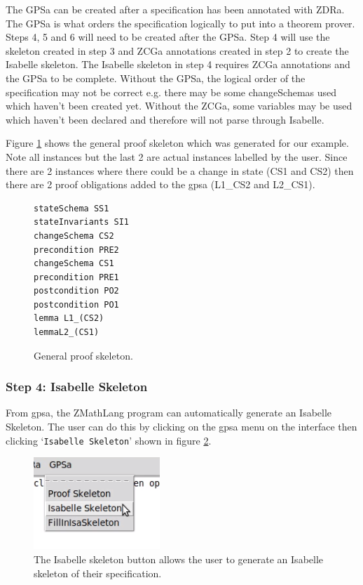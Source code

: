 The GPSa can be created after a specification has been annotated with ZDRa. The GPSa is what orders the specification 
logically to put into a theorem prover. Steps 4, 5 and 6 will need to be created after the GPSa. Step 4 will use the skeleton 
created in step 3 and ZCGa annotations created in step 2 to create the Isabelle skeleton. The Isabelle skeleton in
step 4 requires ZCGa annotations and the GPSa to be complete. Without the GPSa, the logical order of the specification may not be correct
e.g. there may be some changeSchemas used which haven't been created yet. Without the ZCGa, some variables may be used which haven't been 
declared and therefore will not parse through Isabelle.

Figure \ref{fig:gpsaFullexample} shows the general proof skeleton which was
generated for our example. Note all instances but the last 2 are actual
instances labelled by the user. Since there are 2 instances where there could be
a change in state (CS1 and CS2) then there are 2 proof obligations added to the
\gls{gpsa} (L1\_CS2 and L2\_CS1).

\begin{figure}[H]
\centering
\begin{scriptsize}
\begin{BVerbatim}
stateSchema SS1
stateInvariants SI1
changeSchema CS2
precondition PRE2
changeSchema CS1
precondition PRE1
postcondition PO2
postcondition PO1
lemma L1_(CS2)
lemmaL2_(CS1) 
\end{BVerbatim}
\end{scriptsize}
\caption{General proof skeleton. \label{fig:gpsaFullexample}}
\end{figure}

\subsubsection{Step 4: Isabelle Skeleton}

From \gls{gpsa}, the ZMathLang program can automatically generate an Isabelle
Skeleton. The user can do this by clicking on the \gls{gpsa} menu on the
interface then clicking `\texttt{Isabelle Skeleton}' shown in figure
\ref{fig:isabutton}.

\begin{figure}[H]
\centering
\includegraphics[scale=1]{Figures/fullexample/isaskelbutton.png}
\caption{The Isabelle skeleton button allows the user to generate an Isabelle skeleton of their specification. \label{fig:isabutton}}
\end{figure}

